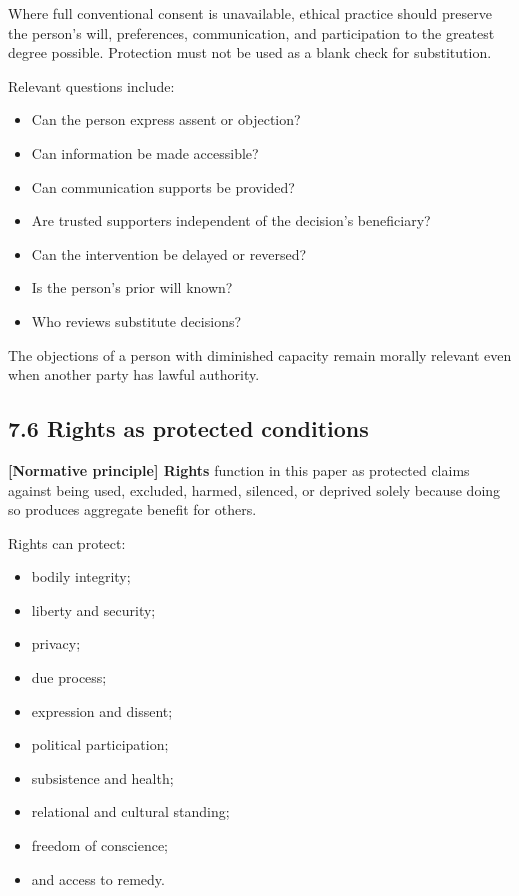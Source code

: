 \documentclass[
  11pt,
]{article}
\providecommand{\tightlist}{%
  \setlength{\itemsep}{0pt}\setlength{\parskip}{0pt}}
\begin{document}
Where full conventional consent is unavailable, ethical practice should
preserve the person's will, preferences, communication, and
participation to the greatest degree possible. Protection must not be
used as a blank check for substitution.

Relevant questions include:

\begin{itemize}
\tightlist
\item
  Can the person express assent or objection?
\item
  Can information be made accessible?
\item
  Can communication supports be provided?
\item
  Are trusted supporters independent of the decision's beneficiary?
\item
  Can the intervention be delayed or reversed?
\item
  Is the person's prior will known?
\item
  Who reviews substitute decisions?
\end{itemize}

The objections of a person with diminished capacity remain morally
relevant even when another party has lawful authority.

\subsection{7.6 Rights as protected
conditions}\label{rights-as-protected-conditions}

\textbf{{[}Normative principle{]} Rights} function in this paper as
protected claims against being used, excluded, harmed, silenced, or
deprived solely because doing so produces aggregate benefit for others.

Rights can protect:

\begin{itemize}
\tightlist
\item
  bodily integrity;
\item
  liberty and security;
\item
  privacy;
\item
  due process;
\item
  expression and dissent;
\item
  political participation;
\item
  subsistence and health;
\item
  relational and cultural standing;
\item
  freedom of conscience;
\item
  and access to remedy.
\end{itemize}
\end{document}
